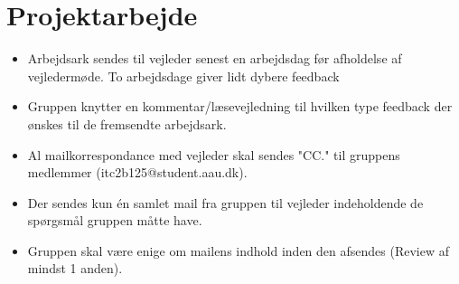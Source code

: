 \documentclass[11pt]{article}
\begin{document}
\section{Projektarbejde}
\begin{itemize}
    \item Arbejdsark sendes til vejleder senest en arbejdsdag før afholdelse af vejledermøde. To arbejdsdage giver lidt dybere feedback
    \item Gruppen knytter en kommentar/læsevejledning til hvilken type feedback der ønskes til de fremsendte arbejdsark.
    \item Al mailkorrespondance med vejleder skal sendes "CC." til gruppens medlemmer (itc2b125@student.aau.dk).
    \item Der sendes kun én samlet mail fra gruppen til vejleder indeholdende de spørgsmål gruppen måtte have.
    \item Gruppen skal være enige om mailens indhold inden den afsendes (Review af mindst 1 anden).
\end{itemize}
\end{document}
